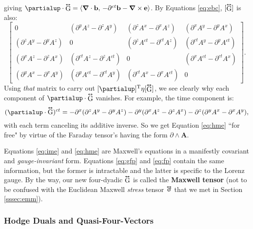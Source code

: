 \documentclass[12pt]{article}
\renewcommand{\vv}[1]{\mathbf{#1}}
\newcommand{\del}{\boldsymbol{\nabla}}
\newcommand{\tightoverset}[2]{%
  \mathop{#2}\limits^{\vbox to -.5ex{\kern-0.75ex\hbox{$#1$}\vss}}}
\newcommand{\inlinedy}[1]{\tightoverset{\text{\tiny$\bm\leftrightarrow$}}{#1}}
\newcommand{\capdy}[1]{ \overset{ \text{\tiny$\bm\leftrightarrow$} }{\vphantom{\text{\small{A}}}\smash{#1}} }
\begin{document}
giving $\partialup \cdot \inlinedy{\mathrm{G}} = \langle \del \cdot \vv b , \, - \partial^{ct} \vv b - \del \times \vv e \rangle$. By Equations \ref{eq:ebc}, $[\inlinedy{\mathrm{G}}]$ is also:
\begin{equation*}
\begin{bmatrix}
0 & ( \partial^y A^z - \partial^z A^y ) & ( \partial^z A^x - \partial^x A^z ) & ( \partial^x A^y - \partial^y A^x ) \\[1.5ex]
( \partial^z A^y - \partial^y A^z ) & 0 & ( \partial^z A^{ct} - \partial^{ct} A^z ) & ( \partial^{ct} A^y - \partial^y A^{ct} ) \\[1.5ex]
( \partial^x A^z - \partial^z A^x ) & ( \partial^{ct} A^z - \partial^z A^{ct} ) & 0 & ( \partial^x A^{ct} - \partial^{ct} A^x ) \\[1.5ex]
( \partial^y A^x - \partial^x A^y ) & ( \partial^y A^{ct} - \partial^{ct} A^y ) & ( \partial^{ct} A^x - \partial^x A^{ct} ) & 0
\end{bmatrix} .
\end{equation*}
Using \emph{that} matrix to carry out $[\partialup]^{\mathrm{T}} \eta [\inlinedy{\mathrm{G}}]$, we see clearly why each component of $\partialup \cdot \inlinedy{\mathrm{G}}$ vanishes. For example, the time component is:
\begin{equation*}
(\partialup \cdot \capdy{\mathrm{G}})^{ct} = - \partial^x ( \partial^z A^y - \partial^y A^z ) - \partial^y ( \partial^x A^z - \partial^z A^x ) - \partial^z ( \partial^y A^x - \partial^x A^y ) ,
\end{equation*}
with each term canceling its additive inverse. So we get Equation \ref{eq:hme} ``for free" by virtue of the Faraday tensor's having the form $\partialup \wedge \vv A$.

Equations \ref{eq:ime} and \ref{eq:hme} are Maxwell's equations in a manifestly covariant and \emph{gauge-invariant} form. Equations \ref{eq:gfp} and \ref{eq:fp} contain the same information, but the former is intractable and the latter is specific to the Lorenz gauge. By the way, our new four-dyadic $\inlinedy{\mathrm{G}}$ is called the \textbf{Maxwell tensor} (not to be confused with the Euclidean Maxwell \emph{stress} tensor $\inlinedy{\upsigma}$ that we met in Section \ref{sssec:emm}).


\subsubsection{Hodge Duals and Quasi-Four-Vectors}
\end{document}
